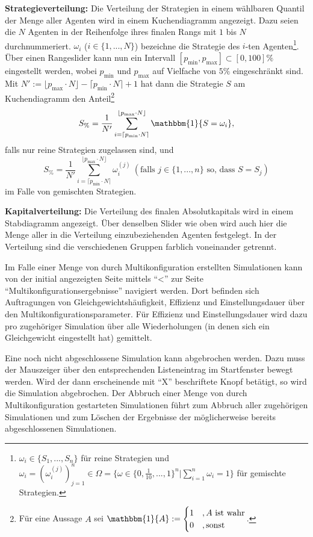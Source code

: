 \documentclass[parskip=full,11pt]{scrartcl}
\begin{document}
\textbf{Strategieverteilung:}
Die Verteilung der Strategien in einem wählbaren Quantil der Menge aller Agenten wird in einem Kuchendiagramm angezeigt. Dazu seien die \(N\) Agenten in der Reihenfolge ihres finalen Rangs mit \(1\) bis \(N\) durchnummeriert. \(\omega_i\) (\(i \in \{1,...,N\}\)) bezeichne die Strategie des \(i\)-ten Agenten\footnote{\(\omega_i \in \{S_1,...,S_n\}\) für reine Strategien und \(\omega_i = (\omega_i^{(j)})_{j=1}^n \in \Omega = \{\omega \in \{0,\frac{1}{10},...,1\}^n | \sum_{i=1}^n \omega_i = 1\}\) für gemischte Strategien.}. Über einen Rangeslider kann nun ein Intervall \([p_\text{min},p_\text{max}] \subset [0,100]\%\) eingestellt werden, wobei \(p_\text{min}\) und \(p_\text{max}\) auf Vielfache von \(5\%\) eingeschränkt sind. Mit \(N' := \lfloor p_\text{max} \cdot N \rfloor - \lceil p_\text{min} \cdot N \rceil + 1\) hat dann die Strategie \(S\) am Kuchendiagramm den Anteil\footnote{Für eine Aussage \(A\) sei \(\mathbbm{1}\{A\} := \begin{cases} 1 & , A \text{ ist wahr} \\ 0 &, \text{sonst}\end{cases}\).}
\[
S_\% = \frac{1}{N'} \sum_{i=\lceil p_\text{min} \cdot N \rceil}^{\lfloor p_\text{max} \cdot N \rfloor} \mathbbm{1}\{S = \omega_i\},
\]
falls nur reine Strategien zugelassen sind, und
\[
S_\% = \frac{1}{N'} \sum_{i=\lceil p_\text{min} \cdot N \rceil}^{\lfloor p_\text{max} \cdot N \rfloor} \omega_i^{(j)}  \ (\text{falls } j \in \{1,...,n\} \text{ so, dass } S = S_j)
\]
im Falle von gemischten Strategien.

\textbf{Kapitalverteilung:}
Die Verteilung des finalen Absolutkapitals wird in einem Stabdiagramm angezeigt. Über denselben Slider wie oben wird auch hier die Menge aller in die Verteilung einzubeziehenden Agenten festgelegt. In der Verteilung sind die verschiedenen Gruppen farblich voneinander getrennt.

Im Falle einer Menge von durch Multikonfiguration erstellten Simulationen kann von der initial angezeigten Seite mittels \enquote{<} zur Seite \enquote{Multikonfigurationsergebnisse} navigiert werden. Dort befinden sich Auftragungen von Gleichgewichtshäufigkeit, Effizienz und Einstellungsdauer über den Multikonfigurationsparameter. Für Effizienz und Einstellungsdauer wird dazu pro zugehöriger Simulation über alle Wiederholungen (in denen sich ein Gleichgewicht eingestellt hat) gemittelt.

Eine noch nicht abgeschlossene Simulation kann abgebrochen werden. Dazu muss der Mauszeiger über den entsprechenden Listeneintrag im Startfenster bewegt werden. Wird der dann erscheinende mit \enquote{X} beschriftete Knopf betätigt, so wird die Simulation abgebrochen. Der Abbruch einer Menge von durch Multikonfiguration gestarteten Simulationen führt zum Abbruch aller zugehörigen Simulationen und zum Löschen der Ergebnisse der möglicherweise bereits abgeschlossenen Simulationen.
\end{document}

